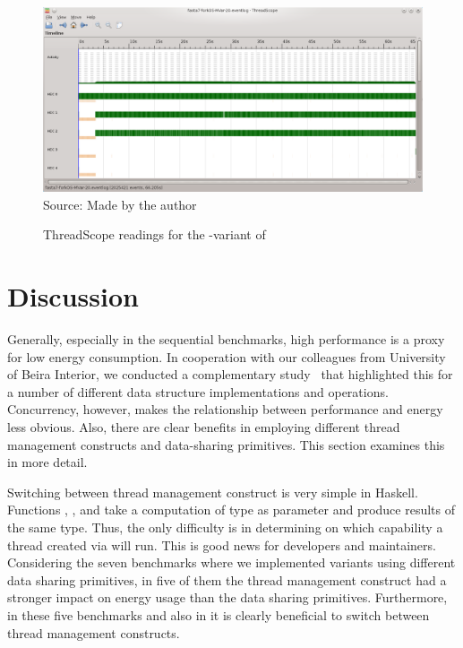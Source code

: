 \begin{figure}
\caption{ThreadScope readings for the \forkOS-\MVar variant of \fasta}
\centering
\includegraphics[width=\linewidth]{images/fasta-forkOS-MVar-20}
\footnotesize{Source: Made by the author}
\label{fig:threadscope2}
\end{figure}


\section{Discussion}\label{sec:discussion}
Generally, especially in the sequential benchmarks, high performance is a proxy for low energy consumption. In cooperation with our colleagues from University of Beira Interior, we conducted a complementary study~\cite{lima:2016} that highlighted this for a number of different data structure implementations and operations. Concurrency, however, makes the relationship between performance and energy less obvious. Also, there are clear benefits in employing  different thread management constructs and data-sharing primitives. This section examines this in more detail.

Switching between thread management construct is very simple in Haskell. Functions \forkOn, \forkIO, and \forkOS take a computation of type \IO as parameter and produce results of the same type. Thus, the only difficulty is in determining on which capability a thread created via \forkOn will run. This is good news for developers and maintainers. Considering the seven benchmarks where we implemented variants using different data sharing primitives, in five of them the thread management construct had a stronger impact on energy usage than the data sharing primitives. Furthermore, in these five benchmarks and also in \warp it is clearly beneficial to switch between thread management constructs.

